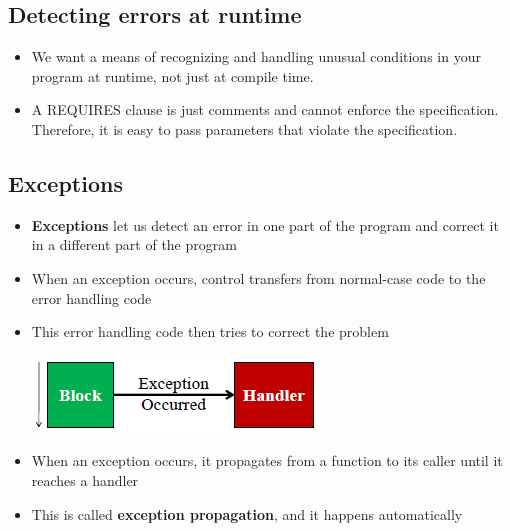 \subsection{Detecting errors at runtime}
\begin{itemize}
	\item We want a means of recognizing and handling unusual conditions in your program at runtime, not just at compile time.
	\item A REQUIRES clause is just comments and cannot enforce the specification. Therefore, it is easy to pass parameters that violate the specification.
\end{itemize}

\subsection{Exceptions}
\begin{itemize}
	\item \textbf{Exceptions} let us detect an error in one part of the program and correct it in a different part of the program
	\item When an exception occurs, control transfers from normal-case code to the error handling code
	\item This error handling code then tries to correct the problem
	\begin{center}
		\includegraphics{sections/lec22/h.png}
	\end{center}
	\item When an exception occurs, it propagates from a function to its caller until it reaches a handler
	\item This is called \textbf{exception propagation}, and it happens automatically
\end{itemize}

